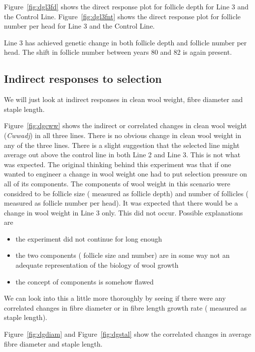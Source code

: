 \documentclass[titlepage]{article}  %
\begin{document}
Figure~\ref{fig:dgl3fd} shows the direct response plot for follicle depth for Line 3 and the Control Line. Figure~\ref{fig:dgl3fnt} shows the direct response plot for follicle number per head for Line 3 and the Control Line.




Line 3 has achieved genetic change in both follicle depth and follicle number per head. The shift in follicle number between years 80 and 82 is again present. 

\subsection{Indirect responses to selection}
We will just look at indirect responses in clean wool weight, fibre diameter and staple length.

Figure~\ref{fig:dgcww} shows the indirect or correlated changes in clean wool weight ({\em Cwwadj}) in all three lines. There is no obvious change in clean wool weight in any of the three lines. There is a slight suggestion that the selected line might average out above the control line in both Line 2 and Line 3. This is not what was expected. The original thinking behind this experiment was that if one wanted to engineer a change in wool weight one had to put selection pressure on all of its components. The components of wool weight in this scenario were considred to be follicle size ( measured as follicle depth) and number of follicles ( measured as follicle number per head). It was expected that there would be a change in wool weight in Line 3 only. This did not occur. Possible explanations are
\begin{itemize}
\item the experiment did not continue for long enough
\item the two components ( follicle size and number) are in some way not an adequate representation of the biology of wool growth
\item the concept of components is somehow flawed
\end{itemize}


We can look into this a little more thoroughly by seeing if there were any correlated changes in fibre diameter or in fibre length growth rate ( measured as staple length).

Figure~\ref{fig:dgdiam} and Figure~\ref{fig:dgstal} show the correlated changes in average fibre diameter and staple length.
\end{document}
